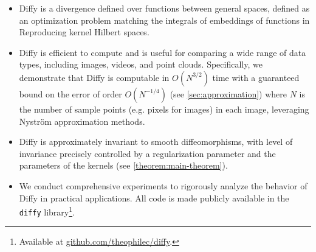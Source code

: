 \begin{itemize}
    \item Diffy is a divergence defined over functions between general spaces, defined as an optimization problem matching the integrals of embeddings of functions in Reproducing kernel Hilbert spaces.
    \item Diffy is efficient to compute and is useful for comparing a wide range of data types, including images, videos, and point clouds. Specifically, we demonstrate that Diffy is computable in $O(N^{3/2})$ time with a guaranteed bound on the error of order $O(N^{-1/4})$ (see \cref{sec:approximation}) where $N$ is the number of sample points (e.g. pixels for images) in each image, leveraging Nyström approximation methods.
    \item Diffy is approximately invariant to smooth diffeomorphisms, with level of invariance precisely controlled by a regularization parameter and the parameters of the kernels (see \cref{theorem:main-theorem}).
    \item We conduct comprehensive experiments to rigorously analyze the behavior of Diffy in practical applications. All code is made publicly available in the \texttt{diffy} library\footnote{Available at \url{github.com/theophilec/diffy}.}.
\end{itemize}





